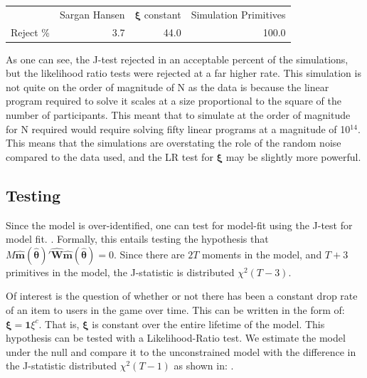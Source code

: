 \documentclass[12pt, letterpaper]{paper}
\begin{document}
\begin{center}
\begin{tabular}{lrrr}
 & Sargan Hansen & $\bm{\xi}$ constant & Simulation Primitives\\
Reject \% & 3.7 & 44.0 & 100.0\\
\end{tabular}
\end{center}

As one can see, the J-test rejected in an acceptable percent of the
simulations, but the likelihood ratio tests were rejected at a far
higher rate. This simulation is not quite on the order of magnitude of
N as the data is because the linear program required to solve it
scales at a size proportional to the square of the number of
participants. This meant that to simulate at the order of magnitude
for N required would require solving fifty linear programs at a magnitude
of 10$^{\text{14}}$. This means that the simulations are overstating the role of
the random noise compared to the data used, and the LR test for $\bm{\xi}$ may
be slightly more powerful.


\subsection{Testing}
\label{sec-4-4}

Since the model is over-identified, one can test for model-fit using
the J-test for model fit. \cite{hall2005generalized}. Formally, this
entails testing the hypothesis that $M \hat{\bm{m}} ( \hat{\bm{\theta}} )' \widehat{\bm{W}}
\hat{\bm{m}} ( \hat{\bm{\theta}} ) = 0$. Since there are $2T$ moments in the model, and
$T + 3$ primitives in the model, the J-statistic is distributed $\chi^2 (
T - 3 )$.

Of interest is the question of whether or not there has been a
constant drop rate of an item to users in the game over time. This can
be written in the form of: $\bm{\xi} = \bm{1} \xi^c$. That is, $\bm{\xi}$ is constant
over the entire lifetime of the model. This hypothesis can be tested
with a Likelihood-Ratio test. We estimate the model under the null and
compare it to the unconstrained model with the difference in the
J-statistic distributed $\chi^2 ( T - 1 )$ as shown in: \cite{hall2005generalized}.
\end{document}
